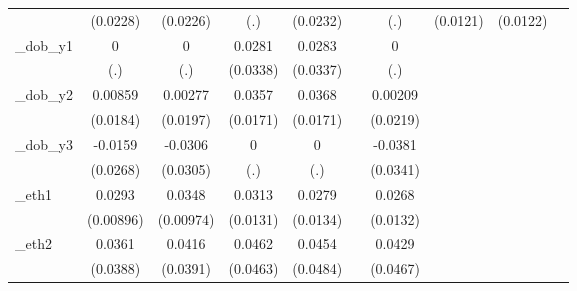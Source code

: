 \begin{table}[htbp]
\begin{tabular}{l*{9}{c}}
            &    (0.0228)         &    (0.0226)         &         (.)         &    (0.0232)         &                     &         (.)         &    (0.0121)         &    (0.0122)         &                     \\
[1em]
\_dob\_y1     &           0         &           0         &      0.0281         &      0.0283         &                     &           0         &                     &                     &                     \\
            &         (.)         &         (.)         &    (0.0338)         &    (0.0337)         &                     &         (.)         &                     &                     &                     \\
[1em]
\_dob\_y2     &     0.00859         &     0.00277         &      0.0357\sym{**} &      0.0368\sym{**} &                     &     0.00209         &                     &                     &                     \\
            &    (0.0184)         &    (0.0197)         &    (0.0171)         &    (0.0171)         &                     &    (0.0219)         &                     &                     &                     \\
[1em]
\_dob\_y3     &     -0.0159         &     -0.0306         &           0         &           0         &                     &     -0.0381         &                     &                     &                     \\
            &    (0.0268)         &    (0.0305)         &         (.)         &         (.)         &                     &    (0.0341)         &                     &                     &                     \\
[1em]
\_eth1       &      0.0293\sym{***}&      0.0348\sym{***}&      0.0313\sym{**} &      0.0279\sym{**} &                     &      0.0268\sym{**} &                     &                     &                     \\
            &   (0.00896)         &   (0.00974)         &    (0.0131)         &    (0.0134)         &                     &    (0.0132)         &                     &                     &                     \\
[1em]
\_eth2       &      0.0361         &      0.0416         &      0.0462         &      0.0454         &                     &      0.0429         &                     &                     &                     \\
            &    (0.0388)         &    (0.0391)         &    (0.0463)         &    (0.0484)         &                     &    (0.0467)         &                     &                     &                     \\

\end{tabular}
\end{table}
